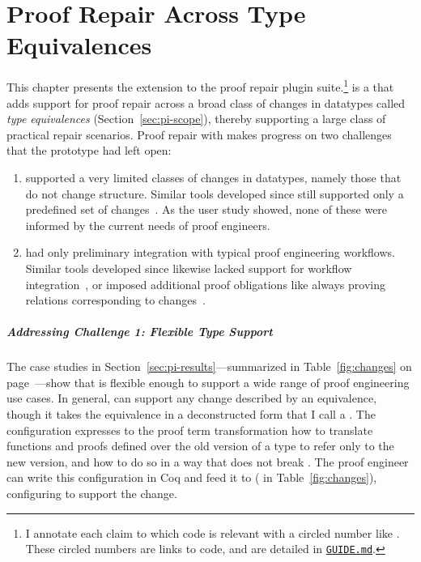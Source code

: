 \chapter{Proof Repair Across Type Equivalences}
\label{chapt:pi}


This chapter presents the \intro{\toolnamec} extension to the \kl{\sysnamelong} proof repair plugin suite.\footnote{I annotate each claim to which code is relevant with a circled number like . These circled numbers are links to code, and are detailed in \href{https://github.com/uwplse/pumpkin-pi/blob/v2.0.0/GUIDE.md}{\lstinline{GUIDE.md}}.} %
\toolnamec is a  that adds support for proof repair across a broad class of changes in datatypes called 
\textit{type equivalences} (Section~\ref{sec:pi-scope}),
thereby supporting a large class of practical repair scenarios.
Proof repair  with \toolnamec makes progress on two challenges that the \sysname prototype had left open:

\begin{enumerate}
\item \sysname supported a very limited classes of changes in datatypes, namely those that do not change structure.
Similar tools developed since still supported only a predefined set of changes~\cite{robert2018, wibergh2019}.
As the  user study showed, none of these were informed by the current needs of proof engineers. %
\item \sysname had only preliminary integration with typical proof engineering workflows.
Similar tools developed since likewise lacked support for workflow integration~\cite{PGL-045, robert2018},
or imposed additional proof obligations like always proving relations corresponding to changes~\cite{tabareau2019marriage}.
\end{enumerate}

\paragraph{Addressing Challenge 1: Flexible Type Support}
The case studies in Section~\ref{sec:pi-results}---summarized in Table~\ref{fig:changes} on page~\pageref{fig:changes}---show that \toolnamec is flexible enough to support
a wide range of proof engineering use cases. %
In general, \toolnamec can support any change described by an equivalence, though it takes the equivalence in a
deconstructed form that I call a .
The configuration expresses to the proof term transformation how to translate functions and proofs defined over the old version of a type
to refer only to the new version, and how to do so in a way that does not break .
The proof engineer can write this configuration in Coq and feed it to \toolnamec ( in Table~\ref{fig:changes}),
configuring \toolnamec to support the change. %

